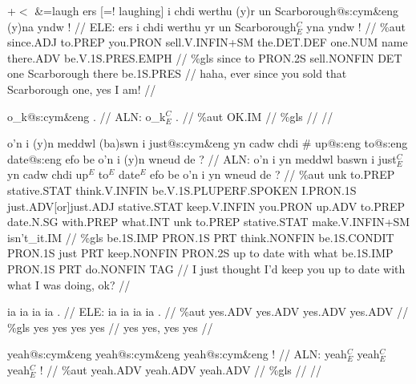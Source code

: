 \documentclass[a4paper,10pt]{article}
\begin{document}
\ex
\begingl[lingstyle=gergl]
\glchat +$<$ \&=laugh ers [=! laughing] i chdi werthu (y)r un Scarborough@s:cym\&eng (y)na yndw ! //
\glsurface ELE:  ers i chdi werthu yr un Scarborough$^{C}_{E}$ yna yndw !  //
\glauto \%aut  since{\scriptsize .ADJ} to{\scriptsize .PREP} you{\scriptsize .PRON} sell{\scriptsize .V.INFIN+SM} the{\scriptsize .DET.DEF} one{\scriptsize .NUM} name there{\scriptsize .ADV} be{\scriptsize .V.1S.PRES.EMPH}   //
\glmanual \%gls  since to PRON{\scriptsize .2S} sell{\scriptsize .NONFIN} DET one Scarborough there be{\scriptsize .1S.PRES}   //
\gleng haha, ever since you sold that Scarborough one, yes I am! //
\endgl
\xe

\ex
\begingl[lingstyle=gergl]
\glchat o\_k@s:cym\&eng . //
\glsurface ALN:  o\_k$^{C}_{E}$ .  //
\glauto \%aut  OK{\scriptsize .IM}   //
\glmanual \%gls     //
\gleng  //
\endgl
\xe

\ex
\begingl[lingstyle=gergl]
\glchat o'n i (y)n meddwl (ba)swn i just@s:cym\&eng yn cadw chdi \# up@s:eng to@s:eng date@s:eng efo be o'n i (y)n wneud de ? //
\glsurface ALN:  o'n i yn meddwl baswn i just$^{C}_{E}$ yn cadw chdi up$^{E}$ to$^{E}$ date$^{E}$ efo be o'n i yn wneud de ?  //
\glauto \%aut  unk to{\scriptsize .PREP} stative{\scriptsize .STAT} think{\scriptsize .V.INFIN} be{\scriptsize .V.1S.PLUPERF.SPOKEN} I{\scriptsize .PRON.1S} just{\scriptsize .ADV[or]just.ADJ} stative{\scriptsize .STAT} keep{\scriptsize .V.INFIN} you{\scriptsize .PRON} up{\scriptsize .ADV} to{\scriptsize .PREP} date{\scriptsize .N.SG} with{\scriptsize .PREP} what{\scriptsize .INT} unk to{\scriptsize .PREP} stative{\scriptsize .STAT} make{\scriptsize .V.INFIN+SM} isn't\_it{\scriptsize .IM}   //
\glmanual \%gls  be{\scriptsize .1S.IMP} PRON{\scriptsize .1S} PRT think{\scriptsize .NONFIN} be{\scriptsize .1S.CONDIT} PRON{\scriptsize .1S} just PRT keep{\scriptsize .NONFIN} PRON{\scriptsize .2S} up to date with what be{\scriptsize .1S.IMP} PRON{\scriptsize .1S} PRT do{\scriptsize .NONFIN} TAG   //
\gleng I just thought I'd keep you up to date with what I was doing, ok? //
\endgl
\xe

\ex
\begingl[lingstyle=gergl]
\glchat ia ia ia ia . //
\glsurface ELE:  ia ia ia ia .  //
\glauto \%aut  yes{\scriptsize .ADV} yes{\scriptsize .ADV} yes{\scriptsize .ADV} yes{\scriptsize .ADV}   //
\glmanual \%gls  yes yes yes yes   //
\gleng yes yes, yes yes //
\endgl
\xe

\ex
\begingl[lingstyle=gergl]
\glchat yeah@s:cym\&eng yeah@s:cym\&eng yeah@s:cym\&eng ! //
\glsurface ALN:  yeah$^{C}_{E}$ yeah$^{C}_{E}$ yeah$^{C}_{E}$ !  //
\glauto \%aut  yeah{\scriptsize .ADV} yeah{\scriptsize .ADV} yeah{\scriptsize .ADV}   //
\glmanual \%gls       //
\gleng  //
\endgl
\xe
\end{document}
